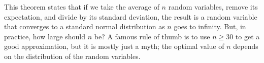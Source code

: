 This theorem states that if we take the average of $n$ random variables, remove its expectation, and divide by its standard deviation, the result is a random variable that converges to a standard normal distribution as $n$ goes to infinity. But, in practice, how large should $n$ be? A famous rule of thumb is to use $n \geq 30$ to get a good approximation, but it is mostly just a myth; the optimal value of $n$ depends on the distribution of the random variables.

